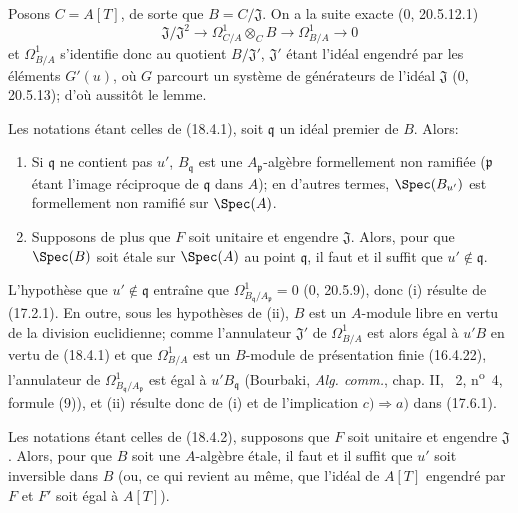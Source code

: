 Posons $C=A[T]$, de sorte que $B=C/\mathfrak J$. On a la suite exacte (0, 20.5.12.1)
\[
  \mathfrak J/\mathfrak J^2\longrightarrow\Omega^1_{C/A}\otimes_C B\longrightarrow\Omega^1_{B/A}\longrightarrow 0
\]
et $\Omega^1_{B/A}$ s'identifie donc au quotient $B/\mathfrak J'$, $\mathfrak J'$ étant l'idéal engendré par les éléments $G'(u)$, où $G$ parcourt un système de générateurs de l'idéal $\mathfrak J$ (0, 20.5.13); d'où aussitôt le lemme.

\begin{proposition}[18.4.2]
\label{IV.18.4.2}
Les notations étant celles de (18.4.1), soit $\mathfrak q$ un idéal premier de $B$. Alors:
\begin{enumerate}
  \item[(i)] Si $\mathfrak q$ ne contient pas $u'$, $B_{\mathfrak q}$ est une $A_{\mathfrak p}$-algèbre formellement non ramifiée ($\mathfrak p$ étant l'image réciproque de $\mathfrak q$ dans $A$); en d'autres termes, $\Spec(B_{u'})$ est formellement non ramifié sur $\Spec(A)$.
  \item[(ii)] Supposons de plus que $F$ soit unitaire et engendre $\mathfrak J$. Alors, pour que $\Spec(B)$ soit étale sur $\Spec(A)$ au point $\mathfrak q$, il faut et il suffit que $u'\notin\mathfrak q$.
\end{enumerate}
\end{proposition}

L'hypothèse que $u'\notin\mathfrak q$ entraîne que $\Omega^1_{B_{\mathfrak q}/A_{\mathfrak p}}=0$ (0, 20.5.9), donc (i) résulte de (17.2.1). En outre, sous les hypothèses de (ii), $B$ est un $A$-module libre en vertu de la division euclidienne; comme l'annulateur $\mathfrak J'$ de $\Omega^1_{B/A}$ est alors égal à $u'B$ en vertu de (18.4.1) et que $\Omega^1_{B/A}$ est un $B$-module de présentation finie (16.4.22), l'annulateur de $\Omega^1_{B_{\mathfrak q}/A_{\mathfrak p}}$ est égal à $u'B_{\mathfrak q}$ (Bourbaki, \emph{Alg. comm.}, chap. II, \textsection~2, n\textsuperscript{o}~4, formule (9)), et (ii) résulte donc de (i) et de l'implication $c)\Rightarrow a)$ dans (17.6.1).

\begin{corollary}[18.4.3]
\label{IV.18.4.3}
Les notations étant celles de (18.4.2), supposons que $F$ soit unitaire et engendre $\mathfrak J$. Alors, pour que $B$ soit une $A$-algèbre étale, il faut et il suffit que $u'$ soit inversible dans $B$ (ou, ce qui revient au même, que l'idéal de $A[T]$ engendré par $F$ et $F'$ soit égal à $A[T]$).
\end{corollary}

